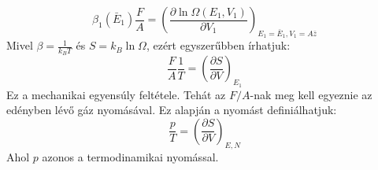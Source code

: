 \documentclass[../main.tex]{subfiles}
\begin{document}
\begin{equation}
    \beta_1(\bar{E}_1) \frac{F}{A} = \left( \frac{\partial \ln \Omega(E_1, V_1)}{\partial V_1} \right)_{E_1 = \bar{E}_1, V_1 = A \bar{z}}
\end{equation}
Mivel $\beta = \frac{1}{k_B T}$ és $S = k_B \ln \Omega$, ezért egyszerűbben írhatjuk:
\begin{equation}
    \frac{F}{A} \frac{1}{T} = \left(\frac{\partial S}{\partial V}\right)_{E_1}
\end{equation}
Ez a mechanikai egyensúly feltétele. Tehát az $F/A$-nak meg kell egyeznie az edényben lévő gáz nyomásával. Ez alapján a nyomást definiálhatjuk:
\begin{equation}
    \boxed{\frac{p}{T} =  \left(\frac{\partial S}{\partial V}\right)_{E, N}}
\end{equation}
Ahol $p$ azonos a termodinamikai nyomással.
\end{document}
